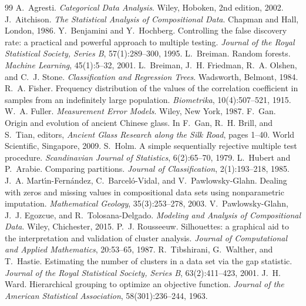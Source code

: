 \documentclass[11pt,a4paper]{article}
\begin{document}
\begingroup
\small
\begin{thebibliography}{99}
 A.~Agresti. \emph{Categorical Data Analysis}. Wiley, Hoboken, 2nd edition, 2002.
 J.~Aitchison. \emph{The Statistical Analysis of Compositional Data}. Chapman and Hall, London, 1986.
 Y.~Benjamini and Y.~Hochberg. Controlling the false discovery rate: a practical and powerful approach to multiple testing. \emph{Journal of the Royal Statistical Society, Series B}, 57(1):289--300, 1995.
 L.~Breiman. Random forests. \emph{Machine Learning}, 45(1):5--32, 2001.
 L.~Breiman, J.~H. Friedman, R.~A. Olshen, and C.~J. Stone. \emph{Classification and Regression Trees}. Wadsworth, Belmont, 1984.
 R.~A. Fisher. Frequency distribution of the values of the correlation coefficient in samples from an indefinitely large population. \emph{Biometrika}, 10(4):507--521, 1915.
 W.~A. Fuller. \emph{Measurement Error Models}. Wiley, New York, 1987.
 F.~Gan. Origin and evolution of ancient Chinese glass. In F.~Gan, R.~H. Brill, and S.~Tian, editors, \emph{Ancient Glass Research along the Silk Road}, pages 1--40. World Scientific, Singapore, 2009.
 S.~Holm. A simple sequentially rejective multiple test procedure. \emph{Scandinavian Journal of Statistics}, 6(2):65--70, 1979.
 L.~Hubert and P.~Arabie. Comparing partitions. \emph{Journal of Classification}, 2(1):193--218, 1985.
 J.~A. Mart{\'\i}n-Fern{\'a}ndez, C.~Barcel{\'o}-Vidal, and V.~Pawlowsky-Glahn. Dealing with zeros and missing values in compositional data sets using nonparametric imputation. \emph{Mathematical Geology}, 35(3):253--278, 2003.
 V.~Pawlowsky-Glahn, J.~J. Egozcue, and R.~Tolosana-Delgado. \emph{Modeling and Analysis of Compositional Data}. Wiley, Chichester, 2015.
 P.~J. Rousseeuw. Silhouettes: a graphical aid to the interpretation and validation of cluster analysis. \emph{Journal of Computational and Applied Mathematics}, 20:53--65, 1987.
 R.~Tibshirani, G.~Walther, and T.~Hastie. Estimating the number of clusters in a data set via the gap statistic. \emph{Journal of the Royal Statistical Society, Series B}, 63(2):411--423, 2001.
 J.~H. Ward. Hierarchical grouping to optimize an objective function. \emph{Journal of the American Statistical Association}, 58(301):236--244, 1963.
\end{thebibliography}
\endgroup
\end{document}
